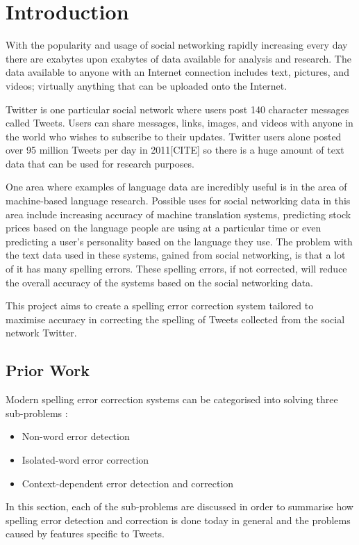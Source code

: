 \chapter{Introduction}
With the popularity and usage of social networking rapidly increasing every day there are exabytes upon exabytes of data available for analysis and research. The data available to anyone with an Internet connection includes text, pictures, and videos; virtually anything that can be uploaded onto the Internet.

Twitter is one particular social network where users post 140 character messages called Tweets. Users can share messages, links, images, and videos with anyone in the world who wishes to subscribe to their updates. Twitter users alone posted over 95 million Tweets per day in 2011[CITE] so there is a huge amount of text data that can be used for research purposes.

One area where examples of language data are incredibly useful is in the area of machine-based language research. Possible uses for social networking data in this area include increasing accuracy of machine translation systems, predicting stock prices based on the language people are using at a particular time or even predicting a user's personality based on the language they use. The problem with the text data used in these systems, gained from social networking, is that a lot of it has many spelling errors. These spelling errors, if not corrected, will reduce the overall accuracy of the systems based on the social networking data.

This project aims to create a spelling error correction system tailored to maximise accuracy in correcting the spelling of Tweets collected from the social network Twitter.

\section{Prior Work}
Modern spelling error correction systems can be categorised into solving three sub-problems \cite{Kukich1992}:

\begin{itemize}
\item
Non-word error detection
\item
Isolated-word error correction
\item
Context-dependent error detection and correction
\end{itemize}

In this section, each of the sub-problems are discussed in order to summarise how spelling error detection and correction is done today in general and the problems caused by features specific to Tweets.

